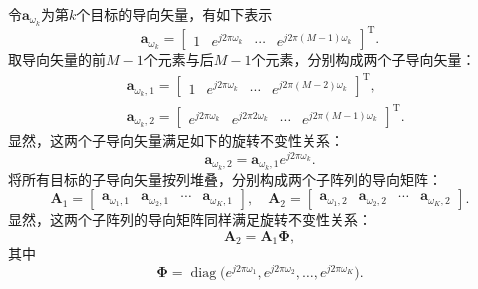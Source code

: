 令\( \bm{a}_{\omega_k} \)为第\( k \)个目标的导向矢量，有如下表示
\[
    \bm{a}_{\omega_k}
    = \begin{bmatrix}
        1 & e^{j2\pi\omega_k} & \cdots & e^{j2\pi(M-1)\omega_k}
    \end{bmatrix}^{\mathrm{T}}.
\]
取导向矢量的前\( M-1 \)个元素与后\( M-1 \)个元素，分别构成两个子导向矢量：
\[
    \begin{split}
         & \bm{a}_{\omega_k, 1} = \begin{bmatrix}
                                      1 & e^{j2\pi\omega_k} & \cdots & e^{j2\pi(M-2)\omega_k}
                                  \end{bmatrix}^{\mathrm{T}},                  \\
         & \bm{a}_{\omega_k, 2} = \begin{bmatrix}
                                      e^{j2\pi\omega_k} & e^{j2\pi2\omega_k} & \cdots & e^{j2\pi(M-1)\omega_k}
                                  \end{bmatrix}^{\mathrm{T}}.
    \end{split}
\]
显然，这两个子导向矢量满足如下的旋转不变性关系：
\[
    \bm{a}_{\omega_k, 2} = \bm{a}_{\omega_k, 1} e^{j2\pi\omega_k}.
\]
将所有目标的子导向矢量按列堆叠，分别构成两个子阵列的导向矩阵：
\[
    \mathbf{A}_1 = \begin{bmatrix}
        \bm{a}_{\omega_1, 1} & \bm{a}_{\omega_2, 1} & \cdots & \bm{a}_{\omega_K, 1}
    \end{bmatrix}, \quad
    \mathbf{A}_2 = \begin{bmatrix}
        \bm{a}_{\omega_1, 2} & \bm{a}_{\omega_2, 2} & \cdots & \bm{a}_{\omega_K, 2}
    \end{bmatrix}.
\]
显然，这两个子阵列的导向矩阵同样满足旋转不变性关系：
\[
    \mathbf{A}_2 = \mathbf{A}_1 \mathbf{\Phi},
\]
其中
\[
    \mathbf{\Phi} = \operatorname{diag}\big(e^{j2\pi\omega_1}, e^{j2\pi\omega_2}, \ldots, e^{j2\pi\omega_K}\big).
\]

